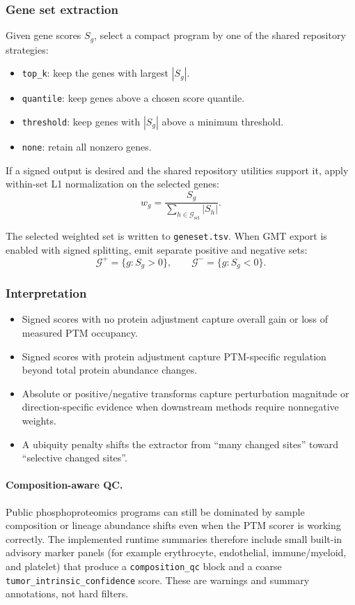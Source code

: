 \documentclass[11pt]{article}
\begin{document}
\subsubsection{Gene set extraction}
Given gene scores $S_g$, select a compact program by one of the shared
repository strategies:
\begin{itemize}
\item \texttt{top\_k}: keep the genes with largest $|S_g|$.
\item \texttt{quantile}: keep genes above a chosen score quantile.
\item \texttt{threshold}: keep genes with $|S_g|$ above a minimum threshold.
\item \texttt{none}: retain all nonzero genes.
\end{itemize}

If a signed output is desired and the shared repository utilities support it,
apply within-set L1 normalization on the selected genes:
\begin{equation}
w_g = \frac{S_g}{\sum_{h \in \mathcal{G}_{\mathrm{sel}}} |S_h|}.
\label{eq:ptm_within_set_l1}
\end{equation}

The selected weighted set is written to \texttt{geneset.tsv}. When GMT export is
enabled with signed splitting, emit separate positive and negative sets:
\[
\mathcal{G}^+ = \{ g : S_g > 0 \},
\qquad
\mathcal{G}^- = \{ g : S_g < 0 \}.
\]

\subsubsection{Interpretation}
\begin{itemize}
\item Signed scores with no protein adjustment capture overall gain or loss of
measured PTM occupancy.
\item Signed scores with protein adjustment capture PTM-specific regulation
beyond total protein abundance changes.
\item Absolute or positive/negative transforms capture perturbation magnitude or
direction-specific evidence when downstream methods require nonnegative weights.
\item A ubiquity penalty shifts the extractor from ``many changed sites'' toward
``selective changed sites''.
\end{itemize}

\paragraph{Composition-aware QC.}
Public phosphoproteomics programs can still be dominated by sample composition
or lineage abundance shifts even when the PTM scorer is working correctly. The
implemented runtime summaries therefore include small built-in advisory marker
panels (for example erythrocyte, endothelial, immune/myeloid, and platelet)
that produce a \texttt{composition\_qc} block and a coarse
\texttt{tumor\_intrinsic\_confidence} score. These are warnings and summary
annotations, not hard filters.
\end{document}
